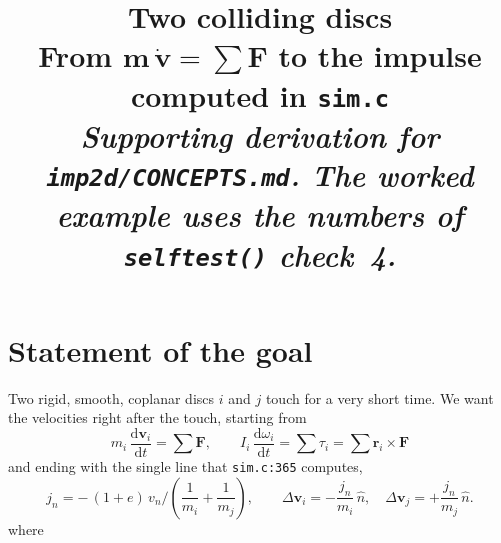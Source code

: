 \documentclass[a4paper,11pt]{article}
\title{\bfseries Two colliding discs\\[4pt]
\large From $\bm{m\,\dot v=\sum F}$ to the impulse computed in
\texttt{sim.c}\\[10pt]
\normalsize\normalfont\itshape
Supporting derivation for \texttt{imp2d/CONCEPTS.md}.
The worked example uses the numbers of \texttt{selftest()} check~4.}
\author{}
\date{}
\newcommand{\vV}{\bm{v}}
\newcommand{\hh}{\hat{n}}
\newcommand{\rr}{\bm{r}}          %
\newcommand{\dd}{\mathrm{d}}
\begin{document}
\maketitle
\vspace{-2.6cm}

\section{Statement of the goal}

Two rigid, smooth, coplanar discs $i$ and $j$ touch for a very short time.
We want the velocities right after the touch, starting from
\begin{equation}
  m_i\,\frac{\dd \vV_i}{\dd t}=\sum \bm{F},
  \qquad
  I_i\,\frac{\dd\omega_i}{\dd t}=\sum\tau_i=\sum\rr_i\times\bm F
  \label{eq:newton}
\end{equation}
and ending with the single line that \texttt{sim.c:365} computes,
\begin{equation}
  j_n=-\,(1+e)\,v_n\Big/\!\left(\frac{1}{m_i}+\frac{1}{m_j}\right) ,
  \qquad
  \Delta\vV_i=-\frac{j_n}{m_i}\,\hh,\quad
  \Delta\vV_j=+\frac{j_n}{m_j}\,\hh .
  \label{eq:goal}
\end{equation}
where
\end{document}
